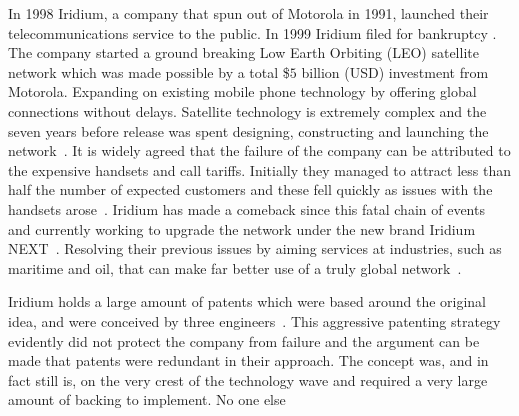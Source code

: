 {}

In 1998 Iridium, a company that spun out of Motorola in 1991, launched their telecommunications service to the public.
In 1999 Iridium filed for bankruptcy \citeneeded.
The company started a ground breaking Low Earth Orbiting (LEO) satellite network which was made possible by a total \$$5$ billion (USD) investment from Motorola.
Expanding on existing mobile phone technology by offering global connections without delays.
Satellite technology is extremely complex and the seven years before release was spent designing, constructing and launching the network~\cite{fink2000iridium}. 
It is widely agreed that the failure of the company can be attributed to the expensive handsets and call tariffs.
Initially they managed to attract less than half the number of expected customers and these fell quickly as issues with the handsets arose~\cite{bill1999}.
Iridium has made a comeback since this fatal chain of events and currently working to upgrade the network under the new brand Iridium NEXT~\cite{iridiumNEXT}.
Resolving their previous issues by aiming services at industries, such as maritime and oil, that can make far better use of a truly global network~\cite{better2009}.

Iridium holds a large amount of patents  which were based around the original idea, and were conceived by three engineers~\cite{ip2010,bertiger1995satellite,bertiger1997satellite}.
This aggressive patenting strategy evidently did not protect the company from failure and the argument can be made that patents were redundant in their approach.
The concept was, and in fact still is, on the very crest of the technology wave and required a very large amount of backing to implement.
No one else 

